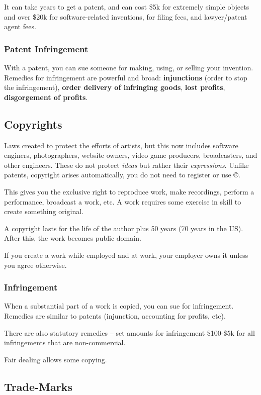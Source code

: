 \documentclass{article}
\begin{document}
It can take years to get a patent, and can cost \$5k for extremely simple objects and over \$20k for software-related inventions, for filing fees, and lawyer/patent agent fees. 

\subsubsection{Patent Infringement}

With a patent, you can sue someone for making, using, or selling your invention. Remedies for infringement are powerful and broad: \textbf{injunctions} (order to stop the infringement), \textbf{order delivery of infringing goods}, \textbf{lost profits}, \textbf{disgorgement of profits}.


\subsection{Copyrights}

Laws created to protect the efforts of artists, but this now includes software enginers, photographers, website owners, video game producers, broadcasters, and other engineers. These do not protect \textit{ideas} but rather their \textit{expressions}. Unlike patents, copyright arises automatically, you do not need to register or use \copyright.

This gives you the exclusive right to reproduce work, make recordings, perform a performance, broadcast a work, etc. A work requires some exercise in skill to create something original. 

A copyright lasts for the life of the author plus 50 years (70 years in the US). After this, the work becomes public domain. 

If you create a work while employed and at work, your employer owns it unless you agree otherwise.

\subsubsection{Infringement}

When a substantial part of a  work is copied, you can sue for infringement. Remedies are similar to patents (injunction, accounting for profits, etc).

There are also statutory remedies -- set amounts for infringement \$100-\$5k for all infringements that are non-commercial.

Fair dealing allows some copying.

\subsection{Trade-Marks}
\end{document}
